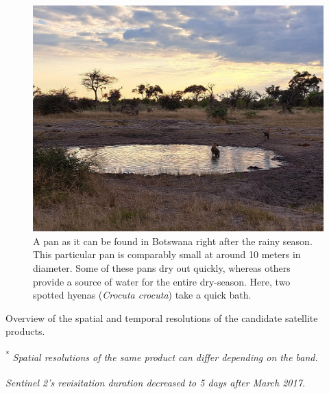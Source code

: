 \documentclass[abstract=on,10pt,a4paper,bibliography=totocnumbered]{article}
\begin{document}
\begin{figure}[htbp]
 \begin{center}
  \includegraphics[width = \textwidth]{Figures/Pan}
  \caption{A pan as it can be found in Botswana right after the rainy season.
  This particular pan is comparably small at around 10 meters in diameter. Some
  of these pans dry out quickly, whereas others provide a source of water for
  the entire dry-season. Here, two spotted hyenas (\textit{Crocuta crocuta})
  take a quick bath.}
  \label{Pan}
 \end{center}
\end{figure}

\begin{table}[h]
  \begin{center}
  \caption{Overview of the spatial and temporal resolutions of the candidate satellite products.}
  \label{Satellite}
    \begin{threeparttable}[h]
      
      \begin{tablenotes}
        \item \textsuperscript{*} \textit{Spatial resolutions of the same product can differ depending on the band.}
        \item \textsuperscript{\dag} \textit{Sentinel 2's revisitation duration decreased to 5 days after March 2017.}
      \end{tablenotes}
    \end{threeparttable}
  \end{center}
\end{table}
\end{document}

